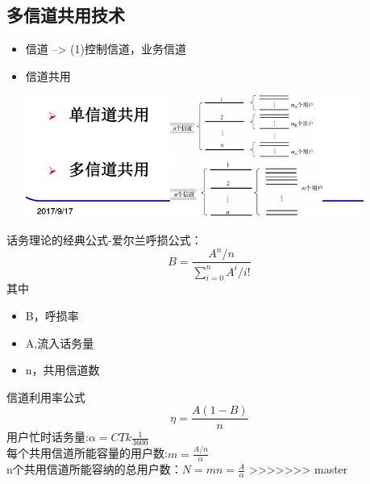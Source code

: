 \documentclass[a4paper ]{report}
\begin{document}
	\subsection{多信道共用技术}
	\begin{itemize}
		\item 信道 --> (1)控制信道，业务信道
		\item 信道共用
		\begin{center}
			\includegraphics[width=\linewidth,height=4cm]{信道共用.png}
		\end{center}
	\end{itemize}
	话务理论的经典公式-爱尔兰呼损公式：
	\begin{equation}
	B = \frac{A^n/n}{\sum_{i=0}^{n}A^i/i!}
	\end{equation}
	其中
	\begin{itemize}
		\item B，呼损率
		\item A,流入话务量
		\item n，共用信道数
	\end{itemize}
	 信道利用率公式
	\begin{equation}
	\eta = \frac{A(1-B)}{n}
	\end{equation}
	用户忙时话务量:$\alpha = CTk\frac{1}{3600}$ \\
	每个共用信道所能容量的用户数:$m = \frac{A/n}{\alpha}$ \\
	n个共用信道所能容纳的总用户数：$N = mn = \frac{A}{\alpha}$
>>>>>>> master
\end{document}
